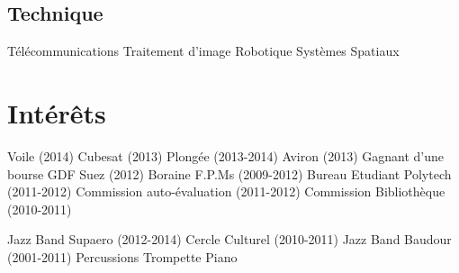 \documentclass[a4paper]{deedy-resume} %
\begin{document}
\begin{minipage}[t]{0.25\textwidth}
\subsection{Technique}
Télécommunications \textbullet{} Traitement d'image \textbullet{} Robotique \textbullet{} Systèmes Spatiaux

\sectionspace %


\section{Intérêts}

Voile (2014) \textbullet{} Cubesat (2013) \textbullet{} Plongée (2013-2014) \textbullet{} Aviron (2013) \textbullet{} Gagnant d'une bourse GDF Suez (2012) \textbullet{}  Boraine F.P.Ms (2009-2012) \textbullet{} Bureau Etudiant Polytech (2011-2012)  \textbullet{} Commission auto-évaluation (2011-2012) \textbullet{} Commission Bibliothèque (2010-2011)
\vspace{3pt}


Jazz Band Supaero (2012-2014) \textbullet{} Cercle Culturel (2010-2011) \textbullet{} Jazz Band Baudour (2001-2011) \textbullet{} Percussions \textbullet{} Trompette \textbullet{} Piano

\sectionspace %


\end{minipage} %
\hfill
%
%
\end{document}
